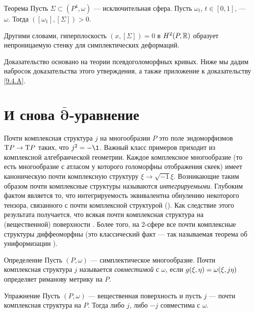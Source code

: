 \begin{thm}{Теорема}\label{10.1.A}
Пусть $\Sigma \subset (P^4, \omega)$ --- исключительная сфера.
Пусть $\omega_t$, $t \in [0, 1]$, ---  $\omega$.
Тогда $([\omega_1 ], [\Sigma]) > 0$.
\end{thm}

Другими словами, гиперплоскость $(x, [\Sigma]) = 0$ в $H^2 (P, \mathbb{R})$ образует непроницаемую стенку для симплектических деформаций.

Доказательство основано на теории псевдоголоморфных кривых.
Ниже мы дадим набросок доказательства этого утверждения, а также
приложение к доказательству \ref{9.4.A}. 

\section[\texorpdfstring{И снова $\bar\partial$-уравнение}{И снова ∂-уравнение}]{И снова $\bm{\bar\partial}$-уравнение}

Почти комплексная структура $j$ на многообразии $P$ это поле
эндоморфизмов $\mathrm{T} P \to \mathrm{T} P$ таких, что $j^2 = -\1$. 
Важный класс примеров приходит из комплексной алгебраической геометрии.
Каждое комплексное многообразие (то есть многообразие с атласом у
которого голоморфны отображения скеек) имеет каноническую почти
комплексную структуру $\xi \to \sqrt{-1}\xi$. 
Возникающие таким образом почти комплексные структуры называются
\emph{интегрируемыми}. 
Глубоким фактом является то, что интегрируемость эквивалентна
обнулению некоторого тензора, связанного с почти комплексной
структурой (\cite{NN}). 
Как следствие этого результата получается, что всякая почти
комплексная структура на (вещественной) поверхности
.
Более того, на 2-сфере все почти комплексные структуры диффеоморфны (это классический факт --- так называемая теорема об униформизации \cite{AS}).

\begin{ex*}{Определение}
Пусть $(P, \omega)$ --- симплектическое многообразие.
Почти комплексная структура $j$ называется \emph{совместимой} с $\omega$, если $g(\xi, \eta) \z= \omega(\xi, j\eta)$ определяет риманову метрику на $P$.
\end{ex*}


\begin{ex}{Упражнение}\label{10.2.A}
Пусть $(P, \omega)$ --- вещественная 
поверхность и пусть $j$ --- почти комплексная структура на $P$. 
Тогда либо $j$, либо $-j$ совместима с $\omega$.
\end{ex}

